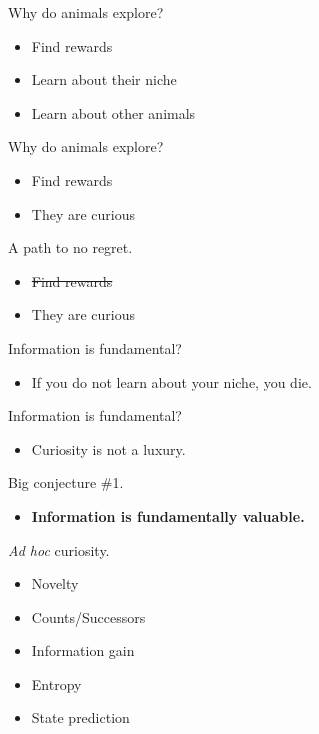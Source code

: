 \documentclass[10pt]{beamer}
\begin{document}
\begin{frame}[fragile]{Why do animals explore?}
\begin{itemize}
    \item Find rewards
    \item Learn about their niche
    \item Learn about other animals
\end{itemize}
\end{frame}

\begin{frame}[fragile]{Why do animals explore?}
\begin{itemize}
    \item Find rewards
    \item They are curious
\end{itemize}
\end{frame}

\begin{frame}[fragile]{A path to no regret.}
\begin{itemize}
    \item \st{Find rewards}
    \item They are curious
\end{itemize}
\end{frame}

\begin{frame}[fragile]{Information is fundamental?}
\begin{itemize}
    \item If you do not learn about your niche, you die.
\end{itemize}
\end{frame}

\begin{frame}[fragile]{Information is fundamental?}
\begin{itemize}
    \item Curiosity is not a luxury.
\end{itemize}
\end{frame}

\begin{frame}[fragile]{Big conjecture \#1.}
\begin{itemize}
    \item \textbf{Information is fundamentally valuable.}
\end{itemize}
\end{frame}

\begin{frame}[fragile]{\textit{Ad hoc} curiosity.}
\begin{itemize}
    \item Novelty
    \item Counts/Successors
    \item Information gain
    \item Entropy
    \item State prediction
\end{itemize}
\end{frame}
\end{document}
